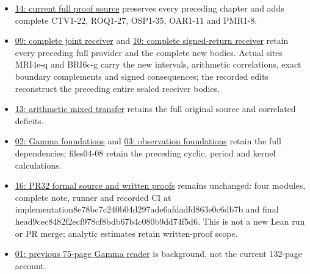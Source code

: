 \documentclass[
]{article}
\providecommand{\tightlist}{%
  \setlength{\itemsep}{0pt}\setlength{\parskip}{0pt}}
\begin{document}
\begin{itemize}
\tightlist
\item
  \href{https://github.com/KokunoYumeto/zeta-function-research-reader/blob/main/workbenches/splitzero-tandem/continuations/20260915-quotient-moment-continuation/14_CURRENT_KERNEL_AND_MULTIPLICITY_PROOFS.tex}{14:
  current full proof source} preserves every preceding chapter and adds
  complete CTV1-22, ROQ1-27, OSP1-35, OAR1-11 and PMR1-8.
\item
  \href{https://github.com/KokunoYumeto/zeta-function-research-reader/blob/main/workbenches/splitzero-tandem/continuations/20260915-quotient-moment-continuation/09_UPDATED_JOINT_NOTE.tex}{09:
  complete joint receiver} and
  \href{https://github.com/KokunoYumeto/zeta-function-research-reader/blob/main/workbenches/splitzero-tandem/continuations/20260915-quotient-moment-continuation/10_UPDATED_SIGNED_RETURN.tex}{10:
  complete signed-return receiver} retain every preceding full provider
  and the complete new bodies. Actual sites MRI4e-q and BRI6c-g carry
  the new intervals, arithmetic correlations, exact boundary complements
  and signed consequences; the recorded edits reconstruct the preceding
  entire sealed receiver bodies.
\item
  \href{https://github.com/KokunoYumeto/zeta-function-research-reader/blob/main/workbenches/splitzero-tandem/continuations/20260915-quotient-moment-continuation/13_ARITHMETIC_MIXED_TRANSFER.tex}{13:
  arithmetic mixed transfer} retains the full original source and
  correlated deficits.
\item
  \href{https://github.com/KokunoYumeto/zeta-function-research-reader/blob/main/workbenches/splitzero-tandem/continuations/20260915-quotient-moment-continuation/02_FULL_GAMMA_PROOFS.tex}{02:
  Gamma foundations} and
  \href{https://github.com/KokunoYumeto/zeta-function-research-reader/blob/main/workbenches/splitzero-tandem/continuations/20260915-quotient-moment-continuation/03_FULL_OBSERVATION_PROOFS.tex}{03:
  observation foundations} retain the full dependencies; files04-08
  retain the preceding cyclic, period and kernel calculations.
\item
  \href{https://github.com/KokunoYumeto/zeta-function-research-reader/blob/main/workbenches/splitzero-tandem/continuations/20260915-quotient-moment-continuation/16_PR32_FORMAL_SOURCE_AND_PROOFS.md}{16:
  PR32 formal source and written proofs} remains unchanged: four
  modules, complete note, runner and recorded CI at
  implementation8e78bc7c240b04d297ade6afdadfd863e0c6db7b and final
  head9cec8482f2ecf978cf8bdb67b4c080b9dd74f5d6. This is not a new Lean
  run or PR merge; analytic estimates retain written-proof scope.
\item
  \href{https://github.com/KokunoYumeto/zeta-function-research-reader/blob/main/workbenches/splitzero-tandem/continuations/20260915-quotient-moment-continuation/01_GAMMA_READER.pdf}{01:
  previous 75-page Gamma reader} is background, not the current 132-page
  account.
\end{itemize}
\end{document}
